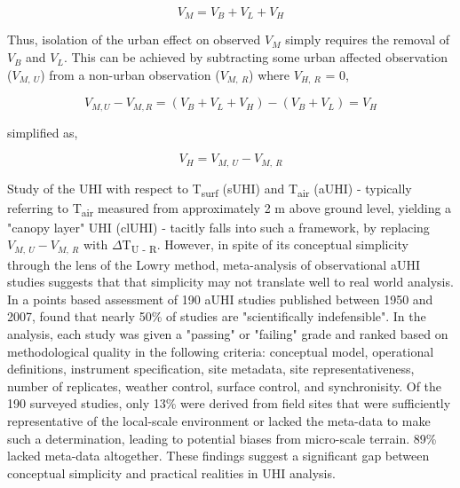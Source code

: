 \begin{bibunit}
\begin{equation}
	V_M = V_B + V_L + V_H
\end{equation}

Thus, isolation of the urban effect on observed $V_M$ simply requires the removal of $V_B$ and $V_L$. This can be achieved by subtracting some urban affected observation ($V_{M, \ U}$) from a non-urban observation ($V_{M, \ R}$) where $V_{H, \ R}$ = 0,

\begin{equation}
V_{M, U} - V_{M, R} = (V_B + V_L + V_H) - (V_B + V_L) = V_H
\label{lowry}
\end{equation}

\noindent simplified as,

\begin{equation}
	V_H = V_{M, \ U} - V_{M, \ R}
\end{equation}

Study of the UHI with respect to T\textsubscript{surf} (sUHI) and T\textsubscript{air} (aUHI) - typically referring to T\textsubscript{air} measured from approximately 2 \si{\meter} above ground level, yielding a "canopy layer" UHI (clUHI) - tacitly falls into such a framework, by replacing $V_{M, \ U} - V_{M, \ R}$ with $\Delta$T\textsubscript{U - R}. However, in spite of its conceptual simplicity through the lens of the Lowry method, meta-analysis of observational aUHI studies suggests that that simplicity may not translate well to real world analysis. In a points based assessment of 190 aUHI studies published between 1950 and 2007, \citet{Stewart2011} found that nearly 50\% of studies are "scientifically indefensible". In the analysis, each study was given a "passing" or "failing" grade and ranked based on methodological quality in the following criteria: conceptual model, operational definitions, instrument specification, site metadata, site representativeness, number of replicates, weather control, surface control, and synchronisity. Of the 190 surveyed studies, only 13\% were derived from field sites that were sufficiently representative of the local-scale environment or lacked the meta-data to make such a determination, leading to potential biases from micro-scale terrain. 89\% lacked meta-data altogether. These findings suggest a significant gap between conceptual simplicity and practical realities in UHI analysis.


\end{bibunit}
